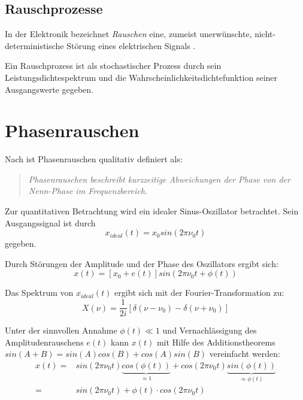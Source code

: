 \subsection{Rauschprozesse}
In der Elektronik bezeichnet \textit{Rauschen} eine, zumeist unerwünschte, nicht-\-deterministische Störung eines elektrischen Signals \cite{Heuermann2018}.

Ein Rauschprozess ist als stochastischer Prozess durch sein Leistungsdichtespektrum und die Wahrscheinlichkeitsdichtefunktion seiner Ausgangswerte gegeben.

\section{Phasenrauschen}
Nach \cite{IEEErandom} ist Phasenrauschen qualitativ definiert als:
\begin{quote}
		\textit{Phasenrauschen beschreibt kurzzeitige Abweichungen der Phase von der Nenn-Phase im Frequenzbereich.} 
\end{quote}

Zur quantitativen Betrachtung wird ein idealer Sinus-Oszillator betrachtet. Sein Ausgangssignal ist durch
\begin{equation}
\label{eq:sinIdeal}
	x_{ideal}(t)=x_0 sin(2\pi \nu_0 t)
\end{equation}
gegeben.

Durch Störungen der Amplitude und der Phase des Oszillators ergibt sich:
\begin{equation}
	x(t)=[x_0 + e(t)] sin\left(2\pi \nu_0 t + \phi(t)\right)
\end{equation}

Das Spektrum von $x_{ideal}(t)$ ergibt sich mit der Fourier-Transformation zu:
\begin{equation}
	X(\nu)=\frac{1}{2 i} \left[ \delta(\nu-\nu_0) - \delta(\nu+\nu_0) \right]
\end{equation}

Unter der sinnvollen Annahme $\phi(t)\ll1$ und Vernachlässigung des Amplitudenrauschens $e(t)$ kann $x(t)$ mit Hilfe des Additionstheorems $sin(A+B) = sin(A)cos(B) + cos(A)sin(B)$ vereinfacht werden:
\begin{align}
	x(t) =& sin\left(2\pi \nu_0 t \right) \underbrace{cos(\phi(t))}_{\approx 1} + cos\left(2\pi \nu_0 t \right) \underbrace{sin(\phi(t))}_{\approx \phi(t)} \\
	=& sin\left(2\pi \nu_0 t \right) + \phi(t) \cdot cos\left(2\pi \nu_0 t \right)
\end{align}

